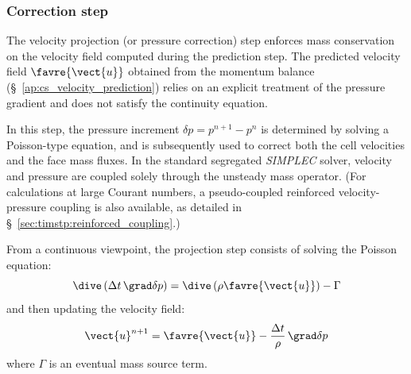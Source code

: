 
%
%
%
%


\subsubsection{Correction step}\label{sec:timstp:correction_step}\label{ap:resopv}

\hypertarget{resopv}{}

The velocity projection (or pressure correction) step enforces mass conservation
on the velocity field computed during the prediction step. The predicted
velocity field $\favre{\vect{u}}$ obtained from the momentum balance
(\S~\ref{ap:cs_velocity_prediction}) relies on an explicit treatment of the
pressure gradient and does not satisfy the continuity equation.

In this step, the pressure increment $\delta p = p^{n+1} - p^n$ is determined by
solving a Poisson-type equation, and is subsequently used to correct both the cell
velocities and the face mass fluxes. In the standard segregated \textit{SIMPLEC}
solver, velocity and pressure are coupled solely through the
unsteady mass operator. (For calculations at large Courant numbers, a pseudo-coupled
reinforced velocity-pressure coupling is also available, as detailed in
\S~\ref{sec:timstp:reinforced_coupling}.)

From a continuous viewpoint, the projection step consists of solving the Poisson
equation:
\begin{equation}
  \dive \left( \Delta t \, \grad \delta p \right) = \dive \left( \rho \favre{\vect{u}} \right) - \Gamma
  \label{eq:pressure_correction:cont_poisson}
\end{equation}
and then updating the velocity field:
\begin{equation}
  \vect{u}^{n+1} = \favre{\vect{u}} - \frac{\Delta t}{\rho} \, \grad \delta p
  \label{eq:pressure_correction:cont_vel_update}
\end{equation}
where $\Gamma$ is an eventual mass source term.

